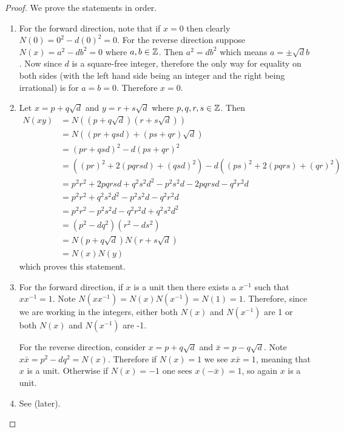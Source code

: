 \begin{proof}
    We prove the statements in order.
    \begin{enumerate}
        \item For the forward direction, note that if $x = 0$ then clearly $N(0) = 0^2 - d(0)^2 = 0$. For the reverse direction suppose $N(x) = a^2 - db^2 = 0$ where $a,b \in \mathbb{Z}$. Then $a^2 = db^2$ which means $a = \pm\sqrt{d}b$. Now since $d$ is a square-free integer, therefore the only way for equality on both sides (with the left hand side being an integer and the right being irrational) is for $a = b = 0$. Therefore $x = 0$.
        
        \item Let $x = p + q\sqrt{d}$ and $y = r + s\sqrt{d}$ where $p,q,r,s \in \mathbb{Z}$. Then
        \begin{align*}
            N(xy) &= N((p+q\sqrt{d})(r+s\sqrt{d}))\\
            &= N((pr + qsd) + (ps + qr)\sqrt{d})\\
            &= (pr+qsd)^2 - d(ps+qr)^2\\
            &= ((pr)^2 + 2(pqrsd) + (qsd)^2) - d((ps)^2 + 2(pqrs) + (qr)^2)\\
            &= p^2r^2 + 2pqrsd + q^2s^2d^2 - p^2s^2d - 2pqrsd - q^2r^2d\\
            &= p^2r^2 + q^2s^2d^2 - p^2s^2d - q^2r^2d\\
            &= p^2r^2 - p^2s^2d - q^2r^2d + q^2s^2d^2\\
            &= (p^2 - dq^2)(r^2 - ds^2)\\
            &= N(p+q\sqrt{d})N(r+s\sqrt{d})\\
            &= N(x)N(y)
        \end{align*}
        which proves this statement.

        \item For the forward direction, if $x$ is a unit then there exists a $x^{-1}$ such that $xx^{-1} = 1$. Note $N(xx^{-1}) = N(x)N(x^{-1}) = N(1) = 1$. Therefore, since we are working in the integers, either both $N(x)$ and $N(x^{-1})$ are 1 or both $N(x)$ and $N(x^{-1})$ are -1.
        
        For the reverse direction, consider $x = p+q\sqrt{d}$ and $\bar{x} = p-q\sqrt{d}$. Note $x\bar{x} = p^2-dq^2 = N(x)$. Therefore if $N(x) = 1$ we see $x\bar{x} = 1$, meaning that $x$ is a unit. Otherwise if $N(x) = -1$ one sees $x(-\bar{x}) = 1$, so again $x$ is a unit.

        \item See  (later).
    \end{enumerate}
\end{proof}

